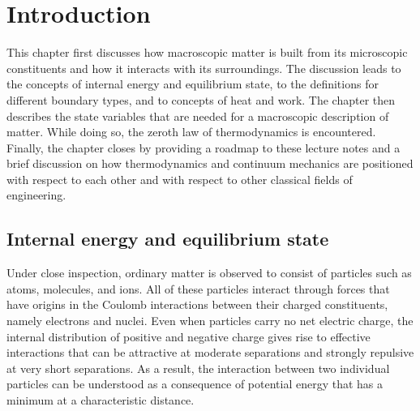 \chapter{Introduction}
This chapter first discusses how macroscopic matter is built from its microscopic constituents and how it interacts with its surroundings. The discussion leads to the concepts of internal energy and equilibrium state, to the definitions for different boundary types, and to concepts of heat and work. The chapter then describes the state variables that are needed for a macroscopic description of matter. While doing so, the zeroth law of thermodynamics is encountered. Finally, the chapter closes by providing a roadmap to these lecture notes and a brief discussion on how thermodynamics and continuum mechanics are positioned with respect to each other and with respect to other classical fields of engineering.

\section{Internal energy and equilibrium state}
Under close inspection, ordinary matter is observed to consist of particles such as atoms, molecules, and ions. All of these particles interact through forces that have origins in the Coulomb interactions between their charged constituents, namely electrons and nuclei. Even when particles carry no net electric charge, the internal distribution of positive and negative charge gives rise to effective interactions that can be attractive at moderate separations and strongly repulsive at very short separations. As a result, the interaction between two individual particles can be understood as a consequence of potential energy that has a minimum at a characteristic distance.


